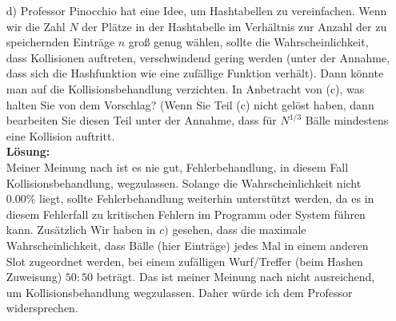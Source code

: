 \begin{enumerate}
\item[d)] Professor Pinocchio hat eine Idee, um Hashtabellen zu vereinfachen. Wenn
wir die Zahl $N$ der Plätze in der Hashtabelle im Verhältnis zur Anzahl der zu
speichernden Einträge $n$ groß genug wählen, sollte die Wahrscheinlichkeit, dass
Kollisionen auftreten, verschwindend gering werden (unter der Annahme, dass
sich die Hashfunktion wie eine zufällige Funktion verhält). Dann könnte man
auf die Kollisionsbehandlung verzichten. In Anbetracht von (c), was halten Sie
von dem Vorschlag? (Wenn Sie Teil (c) nicht gelöst haben, dann bearbeiten Sie
diesen Teil unter der Annahme, dass für $N^{1/3}$ Bälle mindestens eine Kollision
auftritt.\\

\textbf{Lösung:}\\
Meiner Meinung nach ist es nie gut, Fehlerbehandlung, in diesem Fall Kollisionsbehandlung, wegzulassen. Solange die Wahrscheinlichkeit nicht $0.00\%$ liegt, sollte Fehlerbehandlung weiterhin unterstützt werden, da es in diesem Fehlerfall zu kritischen Fehlern im Programm oder System führen kann. Zusätzlich Wir haben in $c)$ gesehen, dass die maximale Wahrscheinlichkeit, dass Bälle (hier Einträge) jedes Mal in einem anderen Slot zugeordnet werden, bei einem zufälligen Wurf/Treffer (beim Hashen Zuweisung) $50:50$ beträgt. Das ist meiner Meinung nach nicht ausreichend, um Kollisionsbehandlung wegzulassen. Daher würde ich dem Professor widersprechen.

\end{enumerate}


